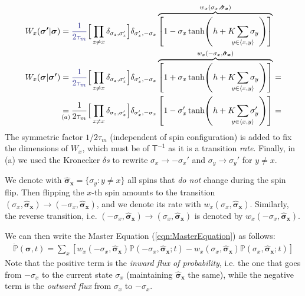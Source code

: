 \documentclass[../../main.tex]{subfiles}
\begin{document}
\begin{align}\label{eqn:flip-tran-rate}
    W_x(\bm{\sigma'}|\bm{\sigma}) &= \textcolor{Blue}{\frac{1}{2 \tau_m} } \Big[\prod_{z \neq x} \delta_{\sigma_z, \sigma_z'} \Big] \delta_{\sigma_x', -\sigma_x}\overbrace{\left[1- \sigma_x \tanh(h + K \sum_{\mathclap{y \in \langle x,y \rangle}} \sigma_y) \right]}^{w_x(\sigma_x, \bm{\hat{\sigma}_x})}  \\ \nonumber
    W_x(\bm{\sigma}|\bm{\sigma'}) &=  \textcolor{Blue}{\frac{1}{2 \tau_m} } \Big[\prod_{z \neq x} \delta_{\sigma_z, \sigma_z'} \Big] \delta_{\sigma_x', -\sigma_x}\overbrace{\left[1+ \sigma_x \tanh(h + K \sum_{\mathclap{y \in \langle x,y \rangle}} \sigma_y) \right]}^{w_x(-\sigma_x, \bm{\hat{\sigma}_x})}  =\\ \nonumber
    &\underset{\mathclap{(a)}}{=} \frac{1}{2 \tau_m} \Big[\prod_{z \neq x} \delta_{\sigma_z, \sigma_z'} \Big] \delta_{\sigma_x', -\sigma_x}\left[1- \sigma_x' \tanh(h + K \sum_{\mathclap{y \in \langle x,y \rangle}} \sigma_y') \right] =
\end{align} 
The symmetric factor $1/2\tau_m$ (independent of spin configuration) is added to fix the dimensions of $W_x$, which must be of $\mathsf{T}^{-1}$ as it is a transition \textit{rate}. Finally, in (a) we used the Kronecker $\delta$\textit{s} to rewrite $\sigma_x \to - \sigma_x'$ and $\sigma_y \to \sigma_y'$ for $y \neq x$.

We denote with $\bm{\hat{\sigma}_x} = \{\sigma_y \colon y \neq x\}$ all spins that \textit{do not} change during the spin flip. Then flipping the $x$-th spin amounts to the transition $(\sigma_x, \bm{\hat{\sigma}_x}) \to (-\sigma_x, \bm{\hat{\sigma}_x})$, and we denote its rate with $w_x(\sigma_x, \bm{\hat{\sigma}_x})$. Similarly, the reverse transition, i.e. $(-\sigma_x, \bm{\hat{\sigma}_x}) \to (\sigma_x, \bm{\hat{\sigma}_x})$ is denoted by $w_x(-\sigma_x, \bm{\hat{\sigma}_x})$.

\medskip

We can then write the Master Equation (\ref{eqn:MasterEquation}) as follows:
\begin{align}\label{eqn:ising-ME}
    \dot{\mathbb{P}}(\bm{\sigma},t) = \sum_x \left[w_x(-\sigma_x, \bm{\hat{\sigma}_x}) \mathbb{P}(-\sigma_x, \bm{\hat{\sigma}_x}; t) - w_x(\sigma_x, \bm{\hat{\sigma}_x}) \mathbb{P}(\sigma_x, \bm{\hat{\sigma}_x};t)\right]
\end{align}
Note that the positive term is the \textit{inward flux of probability}, i.e. the one that goes from $-\sigma_x$ to the current state $\sigma_x$ (maintaining $\bm{\hat{\sigma}_x}$ the same), while the negative term is the \textit{outward flux} from $\sigma_x$ to $-\sigma_x$.   
\end{document}
